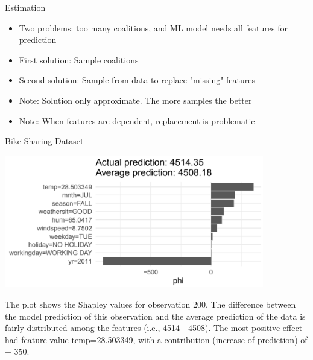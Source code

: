 \documentclass[11pt,compress,t,notes=noshow, xcolor=table]{beamer}
\begin{document}
\begin{vbframe}{Estimation}

  \begin{itemize}
      \item Two problems: too many coalitions, and ML model needs all features for prediction
      \item First solution: Sample coalitions
      \item Second solution: Sample from data to replace "missing" features
      \item Note: Solution only approximate. The more samples the better
      \item Note: When features are dependent, replacement is  problematic
  \end{itemize}      

\end{vbframe}

\begin{vbframe}{Bike Sharing Dataset}

\begin{center}
\includegraphics[width=0.85\textwidth]{figure_man/bike-sharing03.png}
\end{center}

The plot shows the Shapley values for observation 200.
The difference between the model prediction of this observation and the average prediction of the data is fairly distributed among the features (i.e., 4514 - 4508).
The most positive effect had feature value temp=28.503349, with a contribution (increase of prediction) of + 350.
\end{vbframe}


\endlecture
\end{document}
